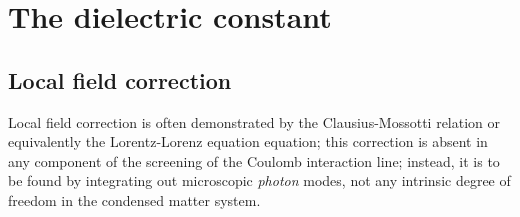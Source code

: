 \documentclass[hyperref, a4paper, 12pt]{report}
\begin{document}
\section{The dielectric constant}

\subsection{Local field correction}

Local field correction is often demonstrated by the Clausius-Mossotti relation 
or equivalently the Lorentz-Lorenz equation equation;
this correction is absent in any component 
of the screening of the Coulomb interaction line;
instead, it is to be found by integrating out 
microscopic \emph{photon} modes, 
not any intrinsic degree of freedom 
in the condensed matter system.
\end{document}

